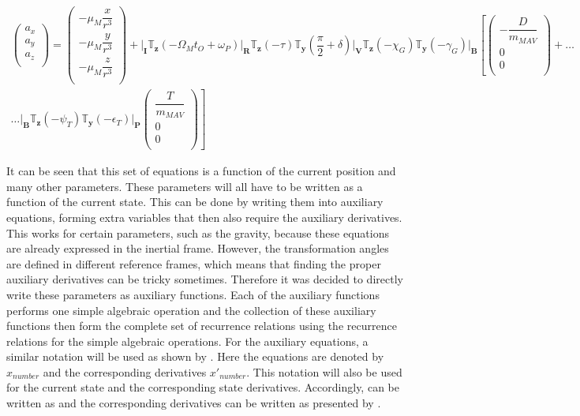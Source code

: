 \begin{multline} \label{eq:acc}
\begin{pmatrix}
a_{x}\\
a_{y}\\
a_{z}\\
\end{pmatrix}
=
\begin{pmatrix}
-\mu_{M}\dfrac{x}{r^{3}}\\
-\mu_{M}\dfrac{y}{r^{3}}\\
-\mu_{M}\dfrac{z}{r^{3}}\\
\end{pmatrix}+
\Bigg|_{\mathbf{I}}\mathbb{T}_{\mathbf{z}}\left(-\Omega_{M}t_{O}+\omega_{P}\right)\Bigg|_{\mathbf{R}}\mathbb{T}_{\mathbf{z}}\left(-\tau\right)\mathbb{T}_{\mathbf{y}}\left(\dfrac{\pi}{2}+\delta\right)\Bigg|_{\mathbf{V}}\mathbb{T}_{\mathbf{z}}\left(-\chi_{G}\right)\mathbb{T}_{\mathbf{y}}\left(-\gamma_{G}\right)\Bigg|_{\mathbf{B}}\left[
\begin{pmatrix}
-\dfrac{D}{m_{MAV}}\\
0\\
0\\
\end{pmatrix}
+  \right. \dots \\
\dotsc
 \left.
\Bigg|_{\mathbf{B}}\mathbb{T}_{\mathbf{z}}\left(-\psi_{T}\right)\mathbb{T}_{\mathbf{y}}\left(-\epsilon_{T}\right)\Bigg|_{\mathbf{P}}
\begin{pmatrix}
\dfrac{T}{m_{MAV}}\\
0\\
0\\
\end{pmatrix}
\right]
\end{multline}

\noindent
It can be seen that this set of equations is a function of the current position and many other parameters. These parameters will all have to be written as a function of the current state. This can be done by writing them into auxiliary equations, forming extra variables that then also require the auxiliary derivatives. This works for certain parameters, such as the gravity, because these equations are already expressed in the inertial frame. However, the transformation angles are defined in different reference frames, which means that finding the proper auxiliary derivatives can be tricky sometimes. Therefore it was decided to directly write these parameters as auxiliary functions. Each of the auxiliary functions performs one simple algebraic operation and the collection of these auxiliary functions then form the complete set of recurrence relations using the recurrence relations for the simple algebraic operations. For the auxiliary equations, a similar notation will be used as shown by \cite{scott2008high}. Here the equations are denoted by $x_{number}$ and the corresponding derivatives $x'_{number}$. This notation will also be used for the current state and the corresponding state derivatives. Accordingly,  can be written as  and the corresponding derivatives can be written as presented by .

